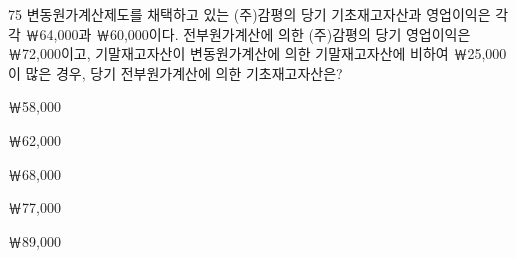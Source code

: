 \begin{question}{75}
변동원가계산제도를 채택하고 있는 (주)감평의 당기 기초재고자산과 영업이익은 각각 ￦64,000과 ￦60,000이다. 전부원가계산에 의한 (주)감평의 당기 영업이익은 ￦72,000이고, 기말재고자산이 변동원가계산에 의한 기말재고자산에 비하여 ￦25,000이 많은 경우, 당기 전부원가계산에 의한 기초재고자산은?
\begin{choices}
  \item ￦58,000
  \item ￦62,000
  \item ￦68,000
  \item ￦77,000
  \item ￦89,000
\end{choices}
\end{question}
